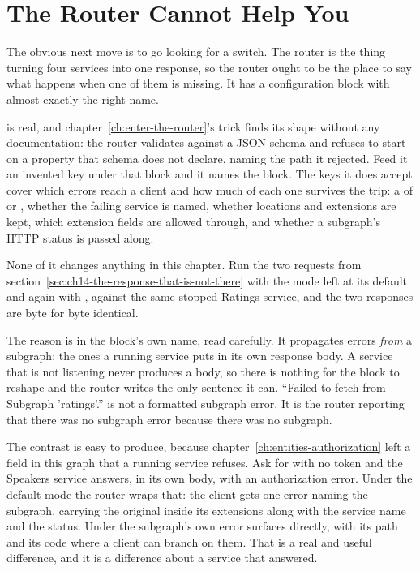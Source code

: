 \section{The Router Cannot Help You}
\label{sec:ch14-the-router-cannot-help-you}

%
The obvious next move is to go looking for a switch. The router is the thing
turning four services into one response, so the router ought to be the place to
say what happens when one of them is missing. It has a configuration block with
almost exactly the right name.

%
 is real, and
chapter~\ref{ch:enter-the-router}'s trick finds its shape without any
documentation: the router validates  against a JSON schema
and refuses to start on a property that schema does not declare, naming the
path it rejected. Feed it an invented key under that block and it names the
block. The keys it does accept cover which errors reach a client and how much
of each one survives the trip: a  of  or
, whether the failing service is named, whether locations
and extensions are kept, which extension fields are allowed through, and
whether a subgraph's HTTP status is passed along.

%
None of it changes anything in this chapter. Run the two requests from
section~\ref{sec:ch14-the-response-that-is-not-there} with the mode left at its
default and again with , against the same stopped Ratings
service, and the two responses are byte for byte identical.

%
The reason is in the block's own name, read carefully. It propagates errors
\emph{from} a subgraph: the ones a running service puts in its own response
body. A service that is not listening never produces a body, so there is
nothing for the block to reshape and the router writes the only sentence it
can. \enquote{Failed to fetch from Subgraph 'ratings'.} is not a formatted
subgraph error. It is the router reporting that there was no subgraph error
because there was no subgraph.

%
The contrast is easy to produce, because chapter~\ref{ch:entities-authorization}
left a field in this graph that a running service refuses. Ask for
 with no token and the Speakers service answers, in its own
body, with an authorization error. Under the default mode the router wraps that:
the client gets one error naming the subgraph, carrying the original inside its
extensions along with the service name and the status. Under
 the subgraph's own error surfaces directly, with its path
and its  code where a client can branch on them.
That is a real and useful difference, and it is a difference about a service
that answered.

